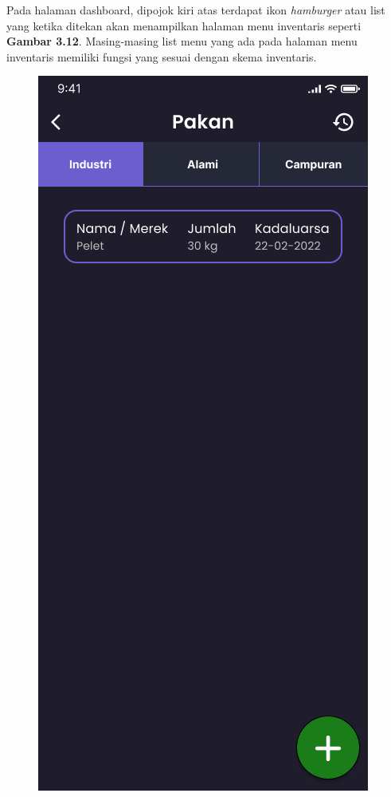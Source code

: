 \begin{enumerate}
\begin{enumerate}
		Pada halaman dashboard, dipojok kiri atas terdapat ikon \textit{hamburger} atau list yang ketika ditekan akan menampilkan halaman menu inventaris seperti \textbf{Gambar 3.12}. Masing-masing list menu yang ada pada halaman menu inventaris memiliki fungsi yang sesuai dengan skema inventaris.

		\begin{figure}[H]
			  \includegraphics[width=\linewidth]{gambar/sprint1/mockup_detail_feed.png}

\end{figure}
\end{enumerate}
\end{enumerate}
